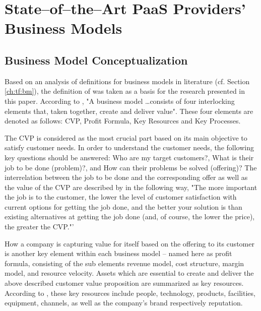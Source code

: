\chapter{State--of--the--Art PaaS Providers' Business Models}\label{ch:sota}


\section{Business Model Conceptualization}

Based on an analysis of definitions for business models in literature (cf. Section \ref{ch:tf:bm}), the definition of \citet{Johnson2008} was taken as a basis for the research presented in this paper. According to \citet[p. 52]{Johnson2008}, "A business model \ldots consists of four interlocking elements that, taken together, create and deliver value". These four elements are denoted as follows: \ac{CVP}, Profit Formula, Key Resources and Key Processes. 

The \ac{CVP} is considered as the most crucial part based on its main objective to satisfy customer needs. In order to understand the customer needs, the following key questions should be answered: Who are my target customers?, What is their job to be done (problem)?, and How can their problems be solved (offering)? The interrelation between the job to be done and the corresponding offer as well as the value of the \ac{CVP} are described by  \citet[p. 52]{Johnson2008} in the following way, "The more important the job is to the customer, the lower the level of customer satisfaction with current options for getting the job done, and the better your solution is than existing alternatives at getting the job done (and, of course, the lower the price), the greater the CVP."'

How a company is capturing value for itself based on the offering to its customer is another key element within each business model -- named here as profit formula, consisting of the sub elements revenue model, cost structure, margin model, and resource velocity. 
Assets which are essential to create and deliver the above described customer value proposition are summarized as key resources. According to \citet[p. 53]{Johnson2008}, these key resources include people, technology, products, facilities, equipment, channels, as well as the company's brand respectively reputation.

